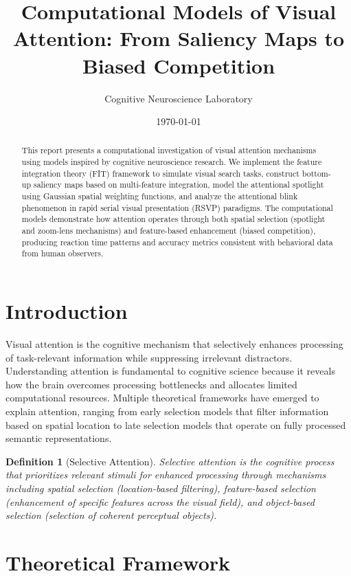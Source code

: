 \documentclass[a4paper, 11pt]{article}
\title{Computational Models of Visual Attention: From Saliency Maps to Biased Competition}
\author{Cognitive Neuroscience Laboratory}
\date{\today}
\newtheorem{definition}{Definition}[section]
\begin{document}
\maketitle

\begin{abstract}
This report presents a computational investigation of visual attention mechanisms using models inspired by cognitive neuroscience research. We implement the feature integration theory (FIT) framework to simulate visual search tasks, construct bottom-up saliency maps based on multi-feature integration, model the attentional spotlight using Gaussian spatial weighting functions, and analyze the attentional blink phenomenon in rapid serial visual presentation (RSVP) paradigms. The computational models demonstrate how attention operates through both spatial selection (spotlight and zoom-lens mechanisms) and feature-based enhancement (biased competition), producing reaction time patterns and accuracy metrics consistent with behavioral data from human observers.
\end{abstract}

\section{Introduction}

Visual attention is the cognitive mechanism that selectively enhances processing of task-relevant information while suppressing irrelevant distractors. Understanding attention is fundamental to cognitive science because it reveals how the brain overcomes processing bottlenecks and allocates limited computational resources. Multiple theoretical frameworks have emerged to explain attention, ranging from early selection models that filter information based on spatial location to late selection models that operate on fully processed semantic representations.

\begin{definition}[Selective Attention]
Selective attention is the cognitive process that prioritizes relevant stimuli for enhanced processing through mechanisms including spatial selection (location-based filtering), feature-based selection (enhancement of specific features across the visual field), and object-based selection (selection of coherent perceptual objects).
\end{definition}

\section{Theoretical Framework}
\end{document}
